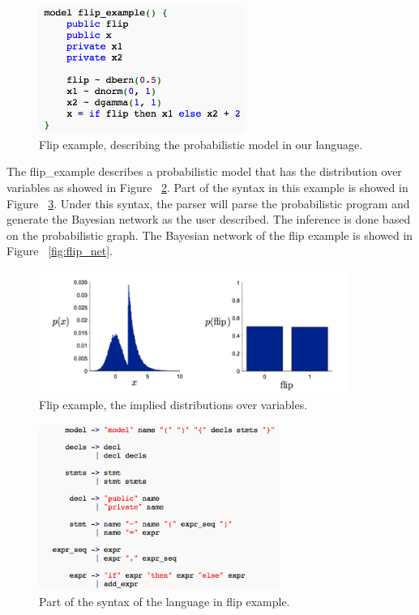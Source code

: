 \begin{figure}
    \centering
    \includegraphics[width=0.6\textwidth]{figures/flip_eg.png}
    \caption{Flip example, describing the probabilistic model in our language.}
    \label{fig:flip_eg}
\end{figure}

The flip\_example describes a probabilistic model that has the distribution over variables as showed in Figure ~\ref{fig:flip_dist}. Part of the syntax in this example is showed in Figure ~\ref{fig:flip_syn}. Under this syntax, the parser will parse the probabilistic program and generate the Bayesian network as the user described. The inference is done based on the probabilistic graph. The Bayesian network of the flip example is showed in Figure ~\ref{fig:flip_net}.


\begin{figure}
    \centering
    \includegraphics[width=0.9\textwidth]{figures/flip_dist.png}
    \caption{Flip example, the implied distributions over variables.}
    \label{fig:flip_dist}
\end{figure}

\begin{figure}
    \centering
    \includegraphics[width=0.7\textwidth]{figures/flip_syn.png}
    \caption{Part of the syntax of the language in flip example.}
    \label{fig:flip_syn}
\end{figure}


